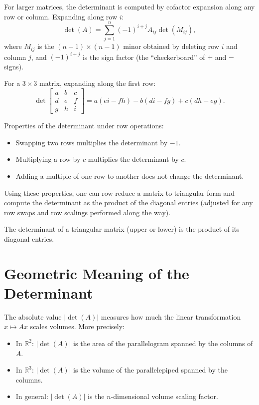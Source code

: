 \documentclass[11pt]{article}
\begin{document}
For larger matrices, the determinant is computed by cofactor expansion along any row or column. Expanding along row $i$:
\[
\det(A) = \sum_{j=1}^n (-1)^{i+j} A_{ij} \det(M_{ij}),
\]
where $M_{ij}$ is the $(n-1) \times (n-1)$ minor obtained by deleting row $i$ and column $j$, and $(-1)^{i+j}$ is the sign factor (the ``checkerboard'' of $+$ and $-$ signs).

For a $3 \times 3$ matrix, expanding along the first row:
\[
\det\begin{bmatrix} a & b & c \\ d & e & f \\ g & h & i \end{bmatrix} = a(ei - fh) - b(di - fg) + c(dh - eg).
\]

Properties of the determinant under row operations:
\begin{itemize}
  \item Swapping two rows multiplies the determinant by $-1$.
  \item Multiplying a row by $c$ multiplies the determinant by $c$.
  \item Adding a multiple of one row to another does not change the determinant.
\end{itemize}

Using these properties, one can row-reduce a matrix to triangular form and compute the determinant as the product of the diagonal entries (adjusted for any row swaps and row scalings performed along the way).

The determinant of a triangular matrix (upper or lower) is the product of its diagonal entries.

\section*{Geometric Meaning of the Determinant}

The absolute value $|\det(A)|$ measures how much the linear transformation $x \mapsto Ax$ scales volumes. More precisely:
\begin{itemize}
  \item In $\mathbb{R}^2$: $|\det(A)|$ is the area of the parallelogram spanned by the columns of $A$.
  \item In $\mathbb{R}^3$: $|\det(A)|$ is the volume of the parallelepiped spanned by the columns.
  \item In general: $|\det(A)|$ is the $n$-dimensional volume scaling factor.
\end{itemize}
\end{document}
